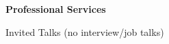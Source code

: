 \documentclass{article}
\begin{document}
\vspace{5mm}
\begin{large}
\noindent \textbf{Professional Services}
\end{large}
\vspace{5mm}


\begin{large}
\noindent Invited Talks (no interview/job talks)
\end{large}
\end{document}
